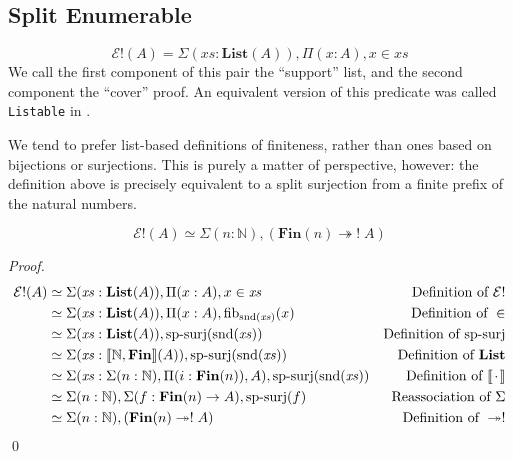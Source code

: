 \subsection{Split Enumerable}
\begin{romdefinition}
  \begin{equation}
    \mathcal{E}!(A) = \Sigma {(\mathit{xs} : \textbf{List}(A))} , \Pi {(x : A)} , x \in \mathit{xs}
  \end{equation}
  We call the first component of this pair the ``support'' list, and the second
  component the ``cover'' proof.
  An equivalent version of this predicate was called \verb+Listable+ in
  \cite{firsovDependentlyTypedProgramming2015}.
\end{romdefinition}

We tend to prefer list-based definitions of finiteness, rather than ones based
on bijections or surjections.
This is purely a matter of perspective, however: the definition above is
precisely equivalent to a split surjection from a finite prefix of the natural
numbers.
\begin{romlemma} \label{split-enum-is-split-surj}
  \begin{equation}
    \mathcal{E}!(A) \simeq \Sigma (n : \mathbb{N}) , \left( \mathbf{Fin}(n) \twoheadrightarrow ! \; A \right)
  \end{equation}
\end{romlemma}
\begin{proof}
  \begin{align*}
    \mathcal{E}!(A)
    & \simeq \Sigma (\mathit{xs} : \textbf{List}(A)) , \Pi {(x : A)} , x \in \mathit{xs}
    & \text{Definition of } \mathcal{E}!
    \\
    & \simeq \Sigma (\mathit{xs} : \textbf{List}(A)) , \Pi {(x : A)} , \text{fib}_{\text{snd}(\mathit{xs})}(x)
    & \text{Definition of } \in
    \\
    & \simeq \Sigma (\mathit{xs} : \textbf{List}(A)) , \text{sp-surj}(\text{snd}(\mathit{xs}))
    & \text{Definition of sp-surj}
    \\
    & \simeq \Sigma (\mathit{xs} : \llbracket \mathbb{N} , \mathbf{Fin} \rrbracket (A)) , \text{sp-surj}(\text{snd}(\mathit{xs}))
    & \text{Definition of } \mathbf{List}
    \\
    & \simeq \Sigma (\mathit{xs} : \Sigma (n : \mathbb{N}) , \Pi (i : \mathbf{Fin}(n)) , A) , \text{sp-surj}(\text{snd}(\mathit{xs}))
    & \text{Definition of } \llbracket {\mkern 2mu\cdot\mkern 2mu} \rrbracket
    \\
    & \simeq \Sigma (n : \mathbb{N}) , \Sigma (f : \mathbf{Fin}(n) \rightarrow A) , \text{sp-surj}(f)
    & \text{Reassociation of } \Sigma
    \\
    & \simeq \Sigma (n : \mathbb{N}) , ( \mathbf{Fin}(n) \twoheadrightarrow ! \; A )
    & \text{Definition of } \twoheadrightarrow!
  \end{align*}
  \qed
\end{proof}

